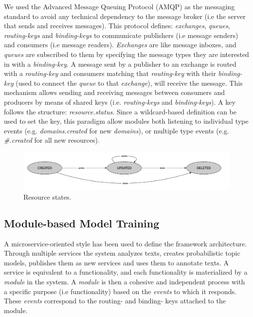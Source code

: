 We used the Advanced Message Queuing Protocol (AMQP) as the messaging standard to avoid any technical dependency to the message broker (i.e the server that sends and receives messages). This protocol defines: \textit{exchanges}, \textit{queues}, \textit{routing-keys} and \textit{binding-keys} to communicate publishers (i.e message senders) and consumers (i.e message readers). \textit{Exchanges} are like message inboxes, and \textit{queues} are subscribed to them by specifying the message types they are interested in with a \textit{binding-key}. A message sent by a publisher to an exchange is routed with a \textit{routing-key} and consumers matching that \textit{routing-key} with their \textit{binding-key} (used to connect the \textit{queue} to that \textit{exchange}), will receive the message. This mechanism allows sending and receiving messages between consumers and producers by means of shared keys (i.e. \textit{routing-keys} and \textit{binding-keys}). A key follows the structure: \textit{resource.status}. Since a wildcard-based definition can be used to set the key, this paradigm allow modules both listening to individual type events (e.g. \textit{domains.created} for new \textit{domains}), or multiple type events (e.g. \textit{\#.created} for all new resources).


\begin{figure}
  \center
  \includegraphics[scale=0.3]{resource-states}
  \caption{Resource states.}
  \label{fig:librairy-states}
\end{figure}


\subsection{Module-based Model Training}
\label{sec:librairy-modules}

A microservice-oriented style has been used to define the framework architecture. Through multiple services the system analyzes texts, creates probabilistic topic models, publishes them as new services and uses them to annotate texts. A service is equivalent to a functionality, and each functionality is materialized by a \textit{module} in the system. A \textit{module} is then a cohesive and independent process \citep{Dragoni2016} with a specific purpose (i.e functionality) based on the \textit{events} to which it responds. These \textit{events} correspond to the routing- and binding- keys attached to the module.

